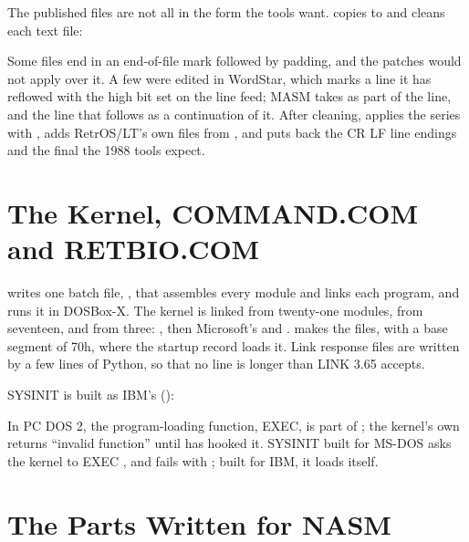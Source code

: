 The published files are not all in the form the tools want.
 copies  to 
and cleans each text file:


Some files end in an end-of-file mark followed by padding, and the
patches would not apply over it. A few were edited in WordStar, which
marks a line it has reflowed with the high bit set on the line feed; MASM
takes  as part of the line, and the line that follows as a
continuation of it. After cleaning,  applies the series with
, adds RetrOS/LT's own files from , and puts back the CR LF line endings and the final
 the 1988 tools expect.


\section{The Kernel, COMMAND.COM and RETBIO.COM}

 writes one batch file, , that
assembles every module and links each program, and runs it in DOSBox-X.
The kernel is linked from twenty-one modules,  from
seventeen, and  from three: , then
Microsoft's  and . 
makes the  files,  with a base segment of 70h,
where the startup record loads it. Link response files are written by a
few lines of Python, so that no line is longer than LINK 3.65 accepts.

SYSINIT is built as IBM's ():


In PC DOS 2, the program-loading function, EXEC, is part of
; the kernel's own returns ``invalid function'' until
 has hooked it. SYSINIT built for MS-DOS asks the kernel
to EXEC , and fails with ; built for IBM, it loads  itself.

\section{The Parts Written for NASM}

